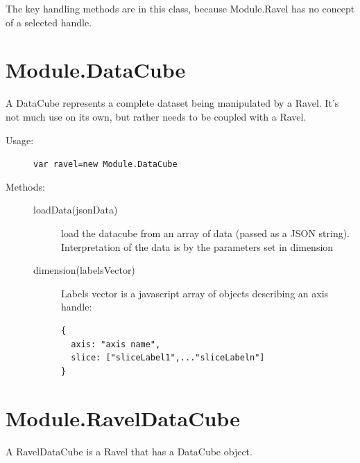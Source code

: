 \documentclass{article}
\begin{document}
The key handling methods are in this class, because Module.Ravel has
no concept of a selected handle.

\section{Module.DataCube}

A DataCube represents a complete dataset being manipulated by a
Ravel. It's not much use on its own, but rather needs to be coupled
with a Ravel.

\begin{description}
\item[Usage:] \verb+var ravel=new Module.DataCube+

\item[Methods:]\mbox{}
\begin{description}
\item[loadData(jsonData)] load the datacube from an array of data
(passed as a JSON string). Interpretation of the data is by the
parameters set in dimension
\item[dimension(labelsVector)] Labels vector is a javascript array of
objects describing an axis handle:
\begin{verbatim}
{
  axis: "axis name",
  slice: ["sliceLabel1",..."sliceLabeln"]
} 
\end{verbatim}
\end{description}
\end{description}

\section{Module.RavelDataCube}

A RavelDataCube is a Ravel that has a DataCube object.
\end{document}
